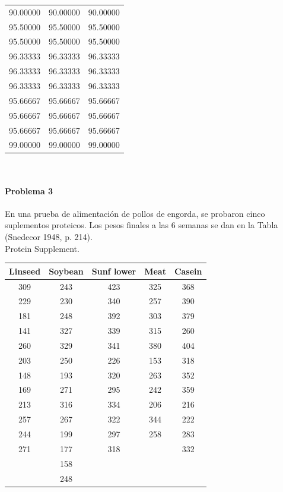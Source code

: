 \documentclass[10pt,a4paper]{report}
\begin{document}
\begin{enumerate}
\begin{tabular}{| c | c | c |}
90.00000&90.00000&90.00000\\
95.50000&95.50000&95.50000\\
95.50000&95.50000&95.50000\\
96.33333&96.33333&96.33333\\
96.33333&96.33333&96.33333\\
96.33333&96.33333&96.33333\\
95.66667&95.66667&95.66667\\
95.66667&95.66667&95.66667\\
95.66667&95.66667&95.66667\\
99.00000&99.00000&99.00000\\
\hline
\end{tabular}
\\

\paragraph{Problema 3} En una prueba de alimentación de pollos de engorda, se probaron cinco suplementos proteicos. Los pesos finales a las 6 semanas se dan en la Tabla (Snedecor 1948, p.
214).\\

Protein Supplement.

\begin{tabular}{| c | c | c | c | c |}
\hline
Linseed & Soybean & Sunf lower & Meat & Casein\\ \hline
309& 243& 423& 325& 368\\
229& 230& 340& 257& 390\\
181& 248& 392& 303& 379\\
141& 327& 339& 315& 260\\
260& 329& 341& 380& 404\\
203& 250& 226& 153& 318\\
148& 193& 320& 263& 352\\
169& 271& 295& 242& 359\\
213& 316& 334& 206& 216\\
257& 267& 322& 344& 222\\
244& 199& 297& 258& 283\\
271& 177& 318& &   332\\
&    158&      &  &\\
&     248 &   &    &\\
\hline
\end{tabular}


\end{enumerate}
\end{document}
